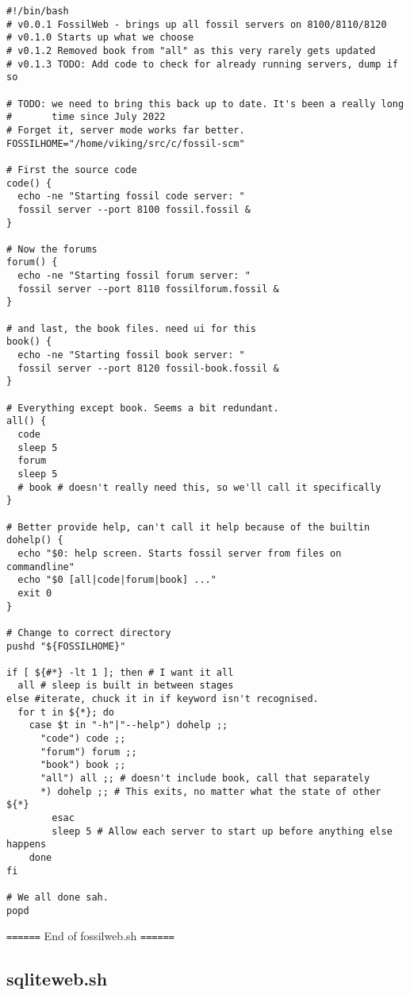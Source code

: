 \documentclass[11pt]{article}
\begin{document}
\begin{verbatim}
#!/bin/bash
# v0.0.1 FossilWeb - brings up all fossil servers on 8100/8110/8120
# v0.1.0 Starts up what we choose
# v0.1.2 Removed book from "all" as this very rarely gets updated
# v0.1.3 TODO: Add code to check for already running servers, dump if so

# TODO: we need to bring this back up to date. It's been a really long
#       time since July 2022
# Forget it, server mode works far better.
FOSSILHOME="/home/viking/src/c/fossil-scm"

# First the source code
code() {
  echo -ne "Starting fossil code server: "
  fossil server --port 8100 fossil.fossil &
}

# Now the forums
forum() {
  echo -ne "Starting fossil forum server: "
  fossil server --port 8110 fossilforum.fossil &
}

# and last, the book files. need ui for this
book() {
  echo -ne "Starting fossil book server: "
  fossil server --port 8120 fossil-book.fossil &
}

# Everything except book. Seems a bit redundant.
all() {
  code
  sleep 5
  forum
  sleep 5
  # book # doesn't really need this, so we'll call it specifically
}

# Better provide help, can't call it help because of the builtin
dohelp() {
  echo "$0: help screen. Starts fossil server from files on commandline"
  echo "$0 [all|code|forum|book] ..."
  exit 0
}

# Change to correct directory
pushd "${FOSSILHOME}"

if [ ${#*} -lt 1 ]; then # I want it all
  all # sleep is built in between stages
else #iterate, chuck it in if keyword isn't recognised.
  for t in ${*}; do
    case $t in "-h"|"--help") dohelp ;;
      "code") code ;;
      "forum") forum ;;
      "book") book ;;
      "all") all ;; # doesn't include book, call that separately
      *) dohelp ;; # This exits, no matter what the state of other ${*}
		esac
		sleep 5 # Allow each server to start up before anything else happens
	done
fi

# We all done sah.
popd

\end{verbatim}

\texttt{======} End of fossilweb.sh \texttt{======}

\subsection*{sqliteweb.sh}
\label{sec:org009b5f5}
\end{document}
